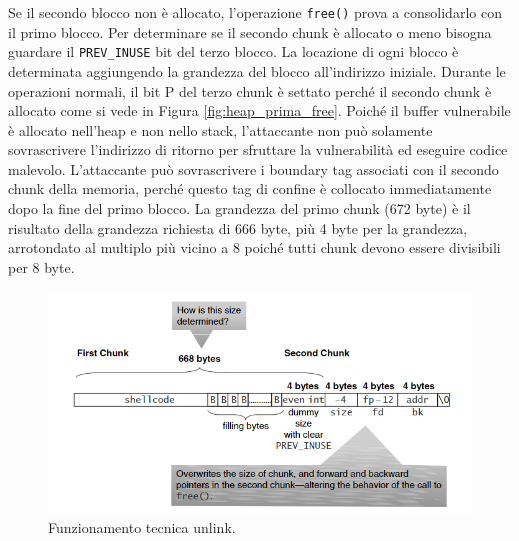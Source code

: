 Se il secondo blocco non è allocato, l'operazione \verb|free()| prova a consolidarlo
con il primo blocco. Per determinare se il secondo chunk è allocato o meno bisogna
guardare il \verb|PREV_INUSE| bit del terzo blocco. La locazione di ogni blocco è
determinata aggiungendo la grandezza del blocco all'indirizzo iniziale.
Durante le operazioni normali, il bit P del terzo chunk è settato perché il secondo
chunk è allocato come si vede in Figura \ref{fig:heap_prima_free}.
Poiché il buffer vulnerabile è allocato nell'heap e non nello stack, l'attaccante non
può solamente sovrascrivere l'indirizzo di ritorno per sfruttare la vulnerabilità ed
eseguire codice malevolo. L'attaccante può sovrascrivere i boundary tag associati
con il secondo chunk della memoria, perché questo tag di confine è collocato
immediatamente dopo la fine del primo blocco. La grandezza del primo chunk (672 byte)
è il risultato della grandezza richiesta di 666 byte, più 4 byte per la grandezza,
arrotondato al multiplo più vicino a 8 poiché tutti chunk devono essere divisibili
per 8 byte.

\begin{figure}[H]
    \centering
    \includegraphics[width=13cm, keepaspectratio]{capitoli/secure_coding/img/cap_4/funzionamento_unlink.png}
    \caption{Funzionamento tecnica unlink.}\label{fig:funzionamento_unlink}
\end{figure}


